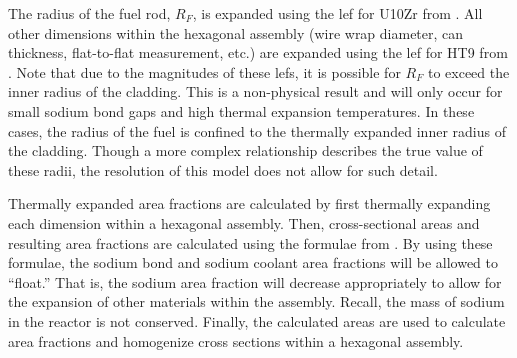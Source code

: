     The radius of the fuel rod, $R_F$, is expanded using the \gls{lef} for
    U10Zr from . All other dimensions within the hexagonal
    assembly (wire wrap diameter, can thickness, flat-to-flat measurement, etc.)
    are expanded using the \gls{lef} for HT9 from . Note that
    due to the magnitudes of these \glspl{lef}, it is possible for $R_F$ to
    exceed the inner radius of the cladding. This is a non-physical result and
    will only occur for small sodium bond gaps and high thermal expansion
    temperatures. In these cases, the radius of the fuel is confined to the
    thermally expanded inner radius of the cladding. Though a more complex
    relationship describes the true value of these radii, the resolution of this
    model does not allow for such detail.
    
    Thermally expanded area fractions are calculated by first thermally 
    expanding each dimension within a hexagonal assembly. Then, cross-sectional
    areas and resulting area fractions are calculated using the formulae from
    . By using these formulae, the sodium bond
    and sodium coolant area fractions will be allowed to ``float.'' That is, the
    sodium area fraction will decrease appropriately to allow for the expansion
    of other materials within the assembly. Recall, the mass of sodium in the
    reactor is not conserved. Finally, the calculated areas are used to
    calculate area fractions and homogenize cross sections within a hexagonal
    assembly.
  
